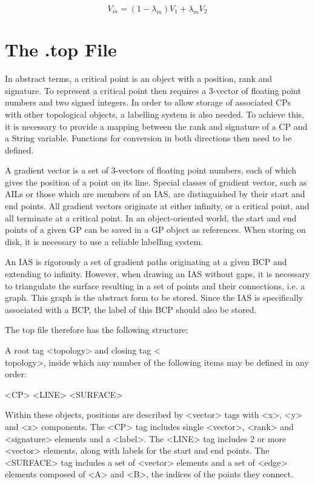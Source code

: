 \documentclass{tufte-book}
\begin{document}
\begin{equation}
V_{m} = (1 - \lambda_{m}) V_{1} + \lambda_{m} V_{2}
\end{equation}

\chapter{The .top File}

In abstract terms, a critical point is an object with a position, rank and signature.
To represent a critical point then requires a 3-vector of floating point numbers and two signed integers.
In order to allow storage of associated CPs with other topological objects, a labelling system is also needed.
To achieve this, it is necessary to provide a mapping between the rank and signature of a CP and a String variable.
Functions for conversion in both directions then need to be defined.

A gradient vector is a set of 3-vectors of floating point numbers, each of which gives the position of a point on its line.
Special classes of gradient vector, such as AILs or those which are members of an IAS, are distinguished by their start and end points.
All gradient vectors originate at either infinity, or a critical point, and all terminate at a critical point.
In an object-oriented world, the start and end points of a given GP can be saved in a GP object as references.
When storing on disk, it is necessary to use a reliable labelling system.

An IAS is rigorously a set of gradient paths originating at a given BCP and extending to infinity.
However, when drawing an IAS without gaps, it is necessary to triangulate the surface resulting in a set of points and their connections, i.e. a graph.
This graph is the abstract form to be stored. Since the IAS is specifically associated with a BCP, the label of this BCP should also be stored.

The top file therefore has the following structure:

A root tag <topology> and closing tag <\\topology>, inside which any number of the following items may be defined in any order:

<CP>
<LINE>
<SURFACE>

Within these objects, positions are described by <vector> tags with <x>, <y> and <z> components.
The <CP> tag includes single <vector>, <rank> and <signature> elements and a <label>.
The <LINE> tag includes 2 or more <vector> elements, along with labels for the start and end points.
The <SURFACE> tag includes a set of <vector> elements and a set of <edge> elements composed of <A> and <B>, the indices of the points they connect.
\end{document}
